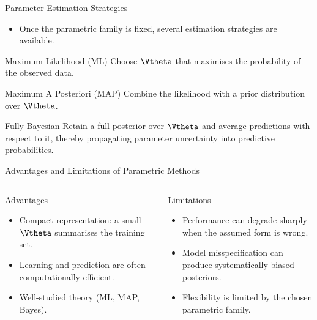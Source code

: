 \begin{frame}{Parameter Estimation Strategies}
  \begin{itemize}
    \item Once the parametric family is fixed, several estimation strategies are available.
  \end{itemize}
  \vspace{0.3em}
  \begin{block}{Maximum Likelihood (ML)}
    Choose $\Vtheta$ that maximises the probability of the observed data.
  \end{block}
  \vspace{0.3em}
  \begin{block}{Maximum A Posteriori (MAP)}
    Combine the likelihood with a prior distribution over $\Vtheta$.
  \end{block}
  \vspace{0.3em}
  \begin{alertblock}{Fully Bayesian}
    Retain a full posterior over $\Vtheta$ and average predictions with respect to it,
    thereby propagating parameter uncertainty into predictive probabilities.
  \end{alertblock}
\end{frame}

\begin{frame}{Advantages and Limitations of Parametric Methods}
  \begin{columns}[t]
      \begin{block}{Advantages}
        \begin{itemize}
          \item Compact representation: a small $\Vtheta$ summarises the training set.
          \item Learning and prediction are often computationally efficient.
          \item Well-studied theory (ML, MAP, Bayes).
        \end{itemize}
      \end{block}
      \begin{alertblock}{Limitations}
        \begin{itemize}
          \item Performance can degrade sharply when the assumed form is \alert{wrong}.
          \item Model misspecification can produce systematically biased posteriors.
          \item Flexibility is limited by the chosen parametric family.
        \end{itemize}
      \end{alertblock}
  \end{columns}
\end{frame}

